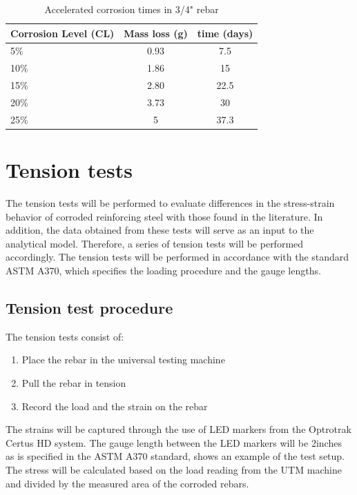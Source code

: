 \begin{table}[htbp]
	\caption{Accelerated corrosion times in 3/4" rebar}
	\label{tab:AcceleratedCorrosionTime}
	\centering	
		\begin{tabular}{l c c}
		Corrosion Level (CL) & Mass loss (g)   & time (days)     \\  \hline	
		5\%                  & 0.93            & 7.5    \\	
		10\%                 & 1.86            & 15     \\	
		15\%                 & 2.80            & 22.5   \\	
		20\%                 & 3.73            & 30     \\
		25\%                 & 5               & 37.3   \\
		\end{tabular}
\end{table}

\section{Tension tests}

The tension tests will be performed to evaluate differences in the stress-strain behavior of corroded reinforcing steel with those found in the literature. In addition, the data obtained from these tests will serve as an input to the analytical model. Therefore, a series of tension tests will be performed accordingly. The tension tests will be performed in accordance with the standard ASTM A370, which specifies the loading procedure and the gauge lengths. 
\subsection{Tension test procedure}

The tension tests consist of:
\begin{enumerate}
    \item Place the rebar in the universal testing machine
    \item Pull the rebar in tension 
    \item Record the load and the strain on the rebar 
\end{enumerate}

The strains will be captured through the use of LED markers from the Optrotrak Certus HD system. The gauge length between the LED markers will be 2inches as is specified in the ASTM A370 standard,  shows an example of the test setup. The stress will be calculated based on the load reading from the UTM machine and divided by the measured area of the corroded rebars.

